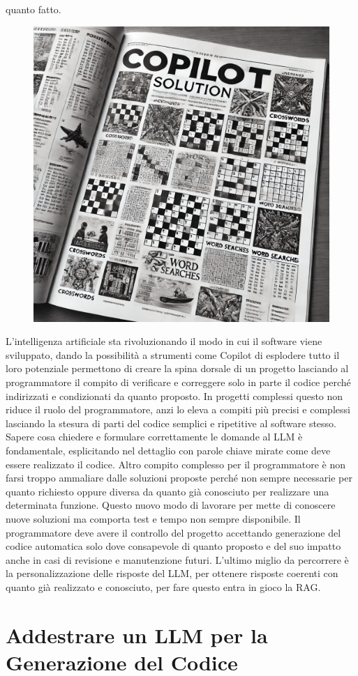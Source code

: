 \documentclass[12pt,a4paper,openright,twoside]{book}
\begin{document}
quanto fatto.
\begin{figure}[h]
    \centering
    \includegraphics[width=0.5\linewidth]{figures/copilotsolutionSettimanaEnigmistica.png}
    \label{fig:Copilot-Solution}
\end{figure}
\newline
L'intelligenza artificiale sta rivoluzionando il modo in cui il software viene sviluppato, dando la possibilità a strumenti come Copilot di esplodere tutto il loro potenziale permettono di creare la spina dorsale di un progetto lasciando al programmatore il compito di verificare e correggere solo in parte il codice perché indirizzati e condizionati da quanto proposto. 
In progetti complessi questo non riduce il ruolo del programmatore, anzi lo eleva a compiti più precisi e complessi lasciando la stesura di parti del codice semplici e ripetitive al software stesso.
Sapere cosa chiedere e formulare correttamente le domande al LLM è fondamentale, esplicitando nel dettaglio con parole chiave mirate come deve essere realizzato il codice.
Altro compito complesso per il programmatore è non farsi troppo ammaliare dalle soluzioni proposte perché non sempre necessarie per quanto richiesto oppure diversa da quanto già conosciuto per realizzare una determinata funzione.
Questo nuovo modo di lavorare per mette di conoscere nuove soluzioni ma comporta test e tempo non sempre disponibile.
Il programmatore deve avere il controllo del progetto accettando generazione del codice automatica solo dove consapevole di quanto proposto e del suo impatto anche in casi di revisione e manutenzione futuri.
L'ultimo miglio da percorrere è la personalizzazione delle risposte del LLM, per ottenere risposte coerenti con quanto già realizzato e conosciuto, per fare questo entra in gioco la RAG.
\chapter{Addestrare un LLM per la Generazione del Codice}
\end{document}
